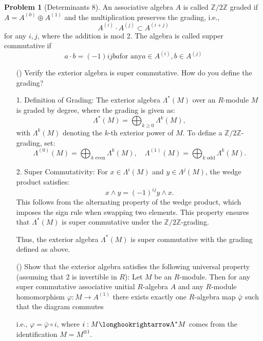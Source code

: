 \documentclass[12pt]{article}
\theoremstyle{definition}
\newtheorem{problem}{Problem}
\newcounter{subq}[problem]
\newenvironment{subproblem}
{\refstepcounter{subq} \begin{itemize} \item[(\alph{subq})]}
{\end{itemize} \medskip}
\begin{document}
\begin{problem}[Determinants 8]
    An associative algebra $A$ is called $\mathbb{Z}/2\mathbb{Z}$ graded if $A = A^(0) \oplus A^(1)$
    and the multiplication preserves the grading, i.e.,
    \[
        A^{(i)} \cdot A^{(j)} \subset A^{(i+j)}
    \]
    for any $i, j$, where the addition is mod 2. The algebra is called supper commutative if
    \[
        a \cdot b = (-1)ijba \text{for any} a \in A^{(i)}, b \in A^{(j)}
    \]

    \begin{subproblem}
        Verify the exterior algebra is super commutative. How do you define the grading?

        \begin{solution}
            1. Definition of Grading:  
            The exterior algebra \( \Lambda^*(M) \) over an \( R \)-module \( M \) is graded by degree, where the grading is given as:
            \[
            \Lambda^*(M) = \bigoplus_{k \geq 0} \Lambda^k(M),
            \]
            with \( \Lambda^k(M) \) denoting the \( k \)-th exterior power of \( M \). To define a \( \mathbb{Z}/2\mathbb{Z} \)-grading, set:
            \[
            \Lambda^{(0)}(M) = \bigoplus_{k \text{ even}} \Lambda^k(M), \quad \Lambda^{(1)}(M) = \bigoplus_{k \text{ odd}} \Lambda^k(M).
            \]

            2. Super Commutativity:  
            For \( x \in \Lambda^i(M) \) and \( y \in \Lambda^j(M) \), the wedge product satisfies:
            \[
            x \wedge y = (-1)^{ij} y \wedge x.
            \]
            This follows from the alternating property of the wedge product, which imposes the sign rule when swapping two elements. This property ensures that \( \Lambda^*(M) \) is super commutative under the \( \mathbb{Z}/2\mathbb{Z} \)-grading.

            Thus, the exterior algebra \( \Lambda^*(M) \) is super commutative with the grading defined as above.
        \end{solution}
    \end{subproblem}

    \begin{subproblem}
        Show that the exterior algebra satisfies the following universal property 
        (assuming that 2 is invertible in $R$): Let $M$ be an $R$-module. Then for 
        any super commutative associative unitial $R$-algebra $A$ and any $R$-module
        homomorphism $\varphi : M \longrightarrow A^{(1)}$ there exists exactly one
        $R$-algebra map $\bar{\varphi}$ such that the diagram commutes
        \begin{center}
        \end{center}
        i.e., $\varphi = \bar{\varphi} \circ i$, where $i : M \longhookrightarrow \Lambda^*M$ 
        comes from the identification $M = M^{\otimes 1}$.


\end{subproblem}
\end{problem}
\end{document}
